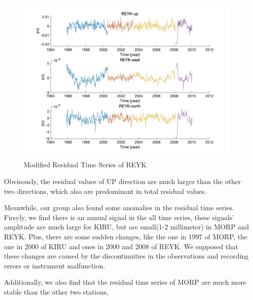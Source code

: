 \documentclass{article}
\begin{document}
\begin{figure}[H]
  \centering
  \includegraphics[width=11cm]{../result/re_figure/fig_REYK/figure3.jpg}
  \caption{Modified Residual Time Series of REYK}
  \label{fig:nRes_REYK}
\end{figure}

Obvisously, the residual values of UP direction are much larger than the other two directions, which also are predominant in total residual values.

Meanwhile, our group also found some anomalies in the residual time series. Firsyly, we find there is an annual signal in the all time series, 
these signals' amplitude are much large for KIRU, but are small(1-2 millimeter) in MORP and REYK.
Plus, there are some sudden changes, like the one in 1997 of MORP, the one in 2000 of KIRU and ones in 2000 and 2008 of REYK.
We supposed that these changes are caused by the discontinuities in the observations and recording errors or instrument malfunction.

Additionally, we also find that the residual time series of MORP are much more stable than the other two stations, 
\end{document}
